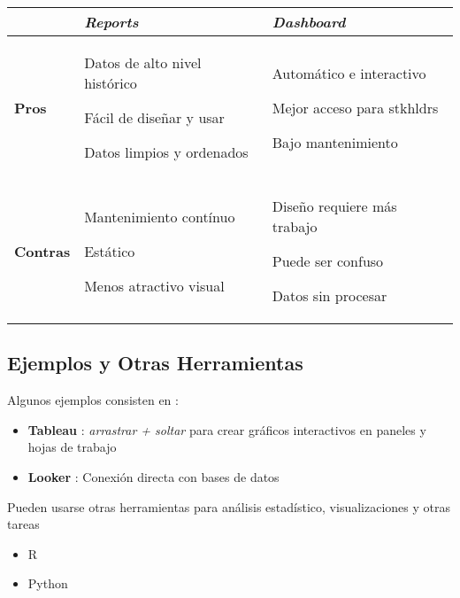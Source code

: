 \begin{table}
    \centering
    \begin{tabular}{|p{1.8cm}|p{5.9cm}|p{5.9cm}|}
        \hline
        & \textbf{\textit{Reports}} & \textbf{\textit{Dashboard}} \\
        \hline
        \textbf{Pros} & \begin{description}
            \item {Datos de alto nivel histórico}
            \item {Fácil de diseñar y usar}
            \item {Datos limpios y ordenados}
        \end{description} & \begin{description}
            \item {Automático e interactivo}
            \item {Mejor acceso para \Gls{stkhldrs}}
            \item {Bajo mantenimiento}
        \end{description} \\
        \hline
        \textbf{Contras} & \begin{description}
            \item {Mantenimiento contínuo}
            \item {Estático}
            \item {Menos atractivo visual}
        \end{description} & \begin{description}
            \item {Diseño requiere más trabajo}
            \item {Puede ser confuso}
            \item {Datos sin procesar}
        \end{description} \\
        \hline
    \end{tabular}
\end{table}
    

\subsection{Ejemplos y Otras Herramientas}
Algunos ejemplos consisten en :
\begin{itemize}
        \item {\textbf{Tableau} : \textit{arrastrar + soltar} para crear gráficos interactivos en paneles y hojas de trabajo}
        \item {\textbf{Looker} : Conexión directa con bases de datos}
\end{itemize}
Pueden usarse otras herramientas para análisis estadístico, visualizaciones y otras tareas
\begin{itemize}
    \item {R}
    \item {Python}
\end{itemize}

\newpage